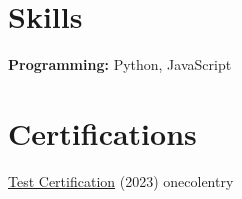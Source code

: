 \documentclass[10pt, letterpaper]{article}
\newenvironment{highlights}
\newenvironment{onecolentry}
\begin{document}
\section{Skills}
\begin{onecolentry}
  \textbf{Programming: } Python, JavaScript
\end{onecolentry}
\vspace{0.2cm}

\section{Certifications}
\begin{highlights}
  \item \href{https://example.com}{Test Certification} (2023)
\end{highlights}
\end{document}
